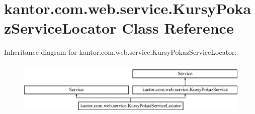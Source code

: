 \hypertarget{classkantor_1_1com_1_1web_1_1service_1_1_kursy_pokaz_service_locator}{\section{kantor.\+com.\+web.\+service.\+Kursy\+Pokaz\+Service\+Locator Class Reference}
\label{classkantor_1_1com_1_1web_1_1service_1_1_kursy_pokaz_service_locator}
}
Inheritance diagram for kantor.\+com.\+web.\+service.\+Kursy\+Pokaz\+Service\+Locator\+:\begin{figure}[H]
\begin{center}
\leavevmode
\includegraphics[height=2.683706cm]{classkantor_1_1com_1_1web_1_1service_1_1_kursy_pokaz_service_locator}
\end{center}
\end{figure}
